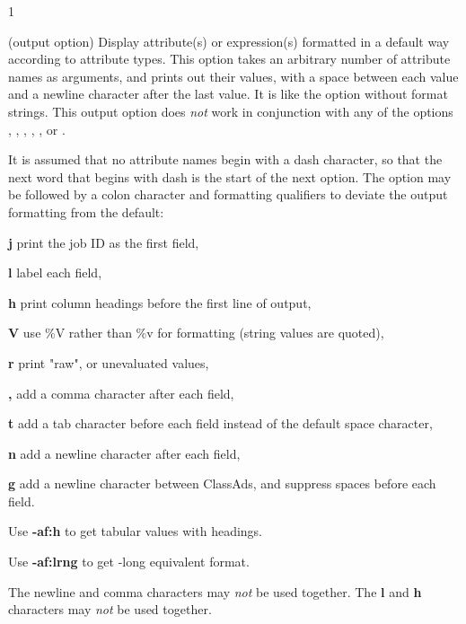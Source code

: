 \begin{ManPage}{\label{man-condor-q}}{1}
\begin{Options}
   {
    (output option) Display attribute(s) or expression(s)
    formatted in a default way according to attribute types.  
    This option takes an arbitrary number of attribute names as arguments,
    and prints out their values, 
    with a space between each value and a newline character after 
    the last value.  
    It is like the  option without format strings.
    This output option does \emph{not} work in conjunction with any of the
    options , , , 
    , , or .

    It is assumed that no attribute names begin with a dash character,
    so that the next word that begins with dash is the 
    start of the next option.
    The  option may be followed by a colon character
    and formatting qualifiers to deviate the output formatting from
    the default:

    \textbf{j} print the job ID as the first field,

    \textbf{l} label each field,

    \textbf{h} print column headings before the first line of output,

    \textbf{V} use \%V rather than \%v for formatting (string values
    are quoted),

    \textbf{r} print "raw", or unevaluated values,

    \textbf{,} add a comma character after each field,

    \textbf{t} add a tab character before each field instead of 
    the default space character,

    \textbf{n} add a newline character after each field,

    \textbf{g} add a newline character between ClassAds, and
    suppress spaces before each field.

    Use \textbf{-af:h} to get tabular values with headings.

    Use \textbf{-af:lrng} to get -long equivalent format.

    The newline and comma characters may \emph{not} be used together.
    The \textbf{l} and \textbf{h} characters may \emph{not} be used
    together.
    }
\end{Options}
\end{ManPage}
